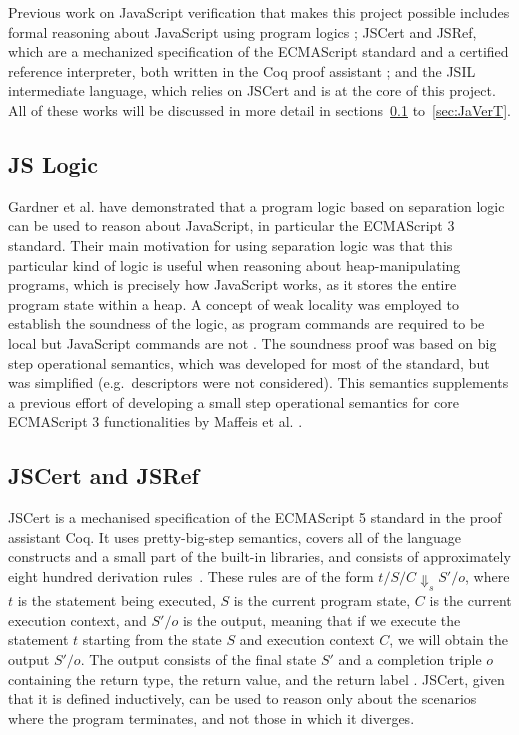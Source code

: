 \documentclass[a4paper,11pt,twoside]{report}
\begin{document}
Previous work on JavaScript verification that makes this project possible includes formal reasoning about JavaScript using program logics \cite{Gardner:2012}; JSCert and JSRef, which are a mechanized specification of the ECMAScript standard and a certified reference interpreter, both written in the Coq proof assistant \cite{Bodin:2014}; and the JSIL intermediate language, which relies on JSCert and is at the core of this project. All of these works will be discussed in more detail in sections~\ref{sec:jslogic} to~\ref{sec:JaVerT}.

\subsection{JS Logic}\label{sec:jslogic}
Gardner et al. \cite{Gardner:2012} have demonstrated that a program logic based on separation logic can be used to reason about JavaScript, in particular the ECMAScript 3 standard. Their main motivation for using separation logic was that this particular kind of logic is useful when reasoning about heap-manipulating programs, which is precisely how JavaScript works, as it stores the entire program state within a heap. A concept of weak locality was employed to establish the soundness of the logic, as program commands are required to be local but JavaScript commands are not \cite{Gardner:2012}. The soundness proof was based on big step operational semantics, which was developed for most of the standard, but was simplified (e.g.~descriptors were not considered). This semantics supplements a previous effort of developing a small step operational semantics for core ECMAScript 3 functionalities by Maffeis et al. \cite{Maffeis:2008}.

\subsection{JSCert and JSRef}\label{sec:jscert}
JSCert is a mechanised specification of the ECMAScript 5 standard in the proof assistant Coq\cite{Bodin:2014}. It uses pretty-big-step semantics, covers all of the language constructs and a small part of the built-in libraries, and consists of approximately eight hundred derivation rules~\cite{Bodin:2014}. These rules are of the form $t/S/C \Downarrow_s S'/o$, where $t$ is the statement being executed, $S$ is the current program state, $C$ is the current execution context, and $S'/o$ is the output, meaning that if we execute the statement $t$ starting from the state $S$ and execution context $C$, we will obtain the output $S'/o$. The output consists of the final state $S'$ and a completion triple $o$ containing the return type, the return value, and the return label \cite{Bodin:2014}. JSCert, given that it is defined inductively, can be used to reason only about the scenarios where the program terminates, and not those in which it diverges. 
\end{document}
